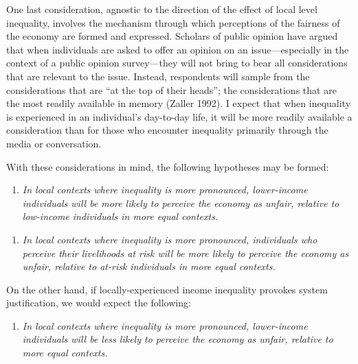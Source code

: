 \documentclass[12pt, letter]{scrartcl}
\begin{document}
One last consideration, agnostic to the direction of the effect of local level inequality, involves the mechanism through which perceptions of the fairness of the economy are formed and expressed. Scholars of public opinion have argued that when individuals are asked to offer an opinion on an issue---especially in the context of a public opinion survey---they will not bring to bear all considerations that are relevant to the issue. Instead, respondents will sample from the considerations that are “at the top of their heads”; the considerations that are the most readily available in memory (Zaller 1992). I expect that when inequality is experienced in an individual's day-to-day life, it will be more readily available a consideration than for those who encounter inequality primarily through the media or conversation. 

With these considerations in mind, the following hypotheses may be formed:

\vspace{15pt}
\singlespacing
\begin{enumerate}[label= \textbf{Hypothesis 1a (H1a)},  leftmargin=*]
  \item \textit{In local contexts where inequality is more pronounced, lower-income individuals will be \textit{more} likely to perceive the economy as unfair, relative to low-income individuals in more equal contexts.}
\end{enumerate}

\begin{enumerate}[label= \textbf{Hypothesis 1b (H1b)},  leftmargin=*]
  \item \textit{In local contexts where inequality is more pronounced, individuals who perceive their livelihoods at risk will be \textit{more} likely to perceive the economy as unfair, relative to at-risk individuals in more equal contexts.}
\end{enumerate}
\doublespacing

On the other hand, if locally-experienced income inequality provokes system justification, we would expect the following:

\vspace{15pt}
\singlespacing
\begin{enumerate}[label= \textbf{Hypothesis 1b (H1b)},  leftmargin=*]
  \item \textit{In local contexts where inequality is more pronounced, lower-income individuals will be \textit{less} likely to perceive the economy as unfair, relative to more equal contexts.}
\end{enumerate}
\end{document}
